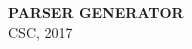 \pagestyle{empty}
\begin{center}
$\ $
\\
\vspace{10cm}
$\ $
\\
{\Large\bf PARSER GENERATOR}
$\ $
\\
\vspace{12cm}
$\ $
\\
CSC, 2017
\end{center}
\clearpage


